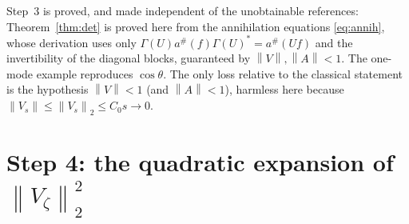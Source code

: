 \documentclass[11pt]{article}
\newcommand{\Gm}{\Gamma}
\newcommand{\norm}[1]{\left\lVert #1\right\rVert}\newcommand{\abs}[1]{\left|#1\right|}
\begin{document}
\begin{verdictok}
Step~3 is proved, and made independent of the unobtainable references: Theorem~\ref{thm:det} is
proved here from the annihilation equations \eqref{eq:annih}, whose derivation uses only
$\Gm(U)a^{\#}(f)\Gm(U)^*=a^{\#}(Uf)$ and the invertibility of the diagonal blocks, guaranteed by
$\norm V,\norm A<1$.  The one-mode example reproduces $\cos\theta$.  The only loss relative to the
classical statement is the hypothesis $\norm V<1$ (and $\norm A<1$), harmless here because
$\norm{V_s}\le\norm{V_s}_2\le C_0s\to0$.
\end{verdictok}

\section{Step 4: the quadratic expansion of $\norm{V_\zeta}_2^2$}\label{sec:step4}
\end{document}
